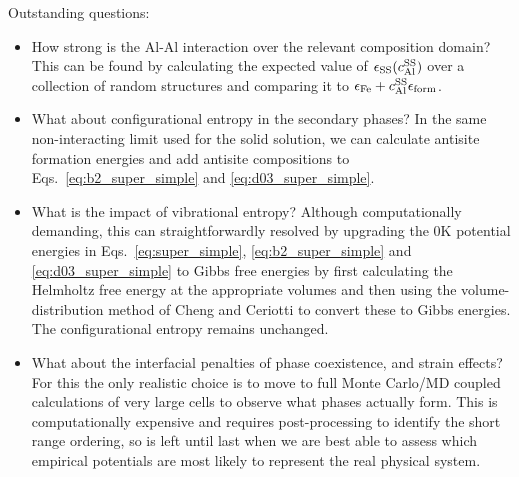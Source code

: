 Outstanding questions:
\begin{itemize}
    \item How strong is the Al-Al interaction over the relevant composition domain? This can be found by calculating the expected value of $\epsilon_{\mathrm{SS}}(c_{\mathrm{Al}}^{\mathrm{SS}})$ over a collection of random structures and comparing it to $\epsilon_{\mathrm{Fe}} + c_{\mathrm{Al}}^{\mathrm{SS}} \epsilon_{\mathrm{form}}$.
    \item What about configurational entropy in the secondary phases? In the same non-interacting limit used for the solid solution, we can calculate antisite formation energies and add antisite compositions to Eqs.~\ref{eq:b2_super_simple} and \ref{eq:d03_super_simple}. 
    \item What is the impact of vibrational entropy? Although computationally demanding, this can straightforwardly resolved by upgrading the 0K potential energies in Eqs.~\ref{eq:super_simple}, \ref{eq:b2_super_simple} and \ref{eq:d03_super_simple} to Gibbs free energies by first calculating the Helmholtz free energy at the appropriate volumes and then using the volume-distribution method of Cheng and Ceriotti \cite{Cheng_Ceriotti_2018} to convert these to Gibbs energies. The configurational entropy remains unchanged.
    \item What about the interfacial penalties of phase coexistence, and strain effects? For this the only realistic choice is to move to full Monte Carlo/MD coupled calculations of very large cells to observe what phases actually form. This is computationally expensive and requires post-processing to identify the short range ordering, so is left until last when we are best able to assess which empirical potentials are most likely to represent the real physical system.
\end{itemize}